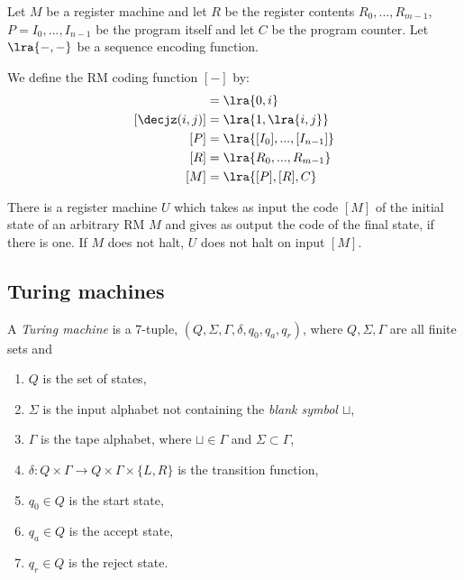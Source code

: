 \documentclass{article}
\begin{document}
\begin{definition}
    Let $M$ be a register machine and let $R$ be the register contents $R_0,...,R_{m-1}$,
    $P=I_0,...,I_{n-1}$ be the program itself and let $C$ be the program counter.
    Let $\lra{-,-}$ be a sequence encoding function.

    We define the RM coding function $[-]$ by:
    \begin{align*}
        [\inc(i)]     & = \lra{0,i}                   \\
        [\decjz(i,j)] & = \lra{1,\lra{i,j}}           \\
        [P]           & = \lra{[I_0], ..., [I_{n-1}]} \\
        [R]           & = \lra{R_0, ..., R_{m-1}}     \\
        [M]           & = \lra{[P], [R], C}
    \end{align*}
\end{definition}

\begin{theorem}[Notes I.7]
    There is a register machine $U$ which takes as input the code $\left[M\right]$ of the
    initial state of an arbitrary RM $M$ and gives as output the code of the final
    state, if there is one. If $M$ does not halt, $U$ does not halt on input
    $\left[M\right]$.
\end{theorem}

\subsection{Turing machines}

\begin{definition}
    A \emph{Turing machine} is a 7-tuple, $(Q, \Sigma, \Gamma, \delta, q_0, q_a, q_r)$,
    where $Q,\Sigma,\Gamma$ are all finite sets and
    \begin{enumerate}
        \item $Q$ is the set of states,
        \item $\Sigma$ is the input alphabet not containing the \emph{blank symbol $\sqcup$},
        \item $\Gamma$ is the tape alphabet, where $\sqcup\in\Gamma$ and $\Sigma\subset\Gamma$,
        \item $\delta:Q\times\Gamma\to Q\times\Gamma\times\{L,R\}$ is the transition function,
        \item $q_0\in Q$ is the start state,
        \item $q_a\in Q$ is the accept state,
        \item $q_r\in Q$ is the reject state.
    \end{enumerate}
\end{definition}
\end{document}
